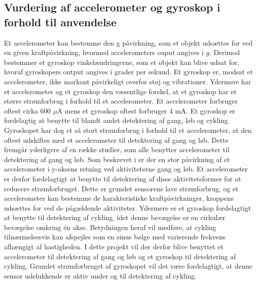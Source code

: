 \subsection{Vurdering af accelerometer og gyroskop i forhold til anvendelse}\label{acc_og_gyro}
Et accelerometer kan bestemme den g påvirkning, som et objekt udsættes for ved en given kraftpåvirkning, hvormed accelerometers ouput angives i $g$. Derimod bestemmer et gyroskop vinkelændringerne, som et objekt kan blive udsat for, hvoraf gyroskopers output angives i grader per sekund. Et gyroskop er, modsat et accelerometer, ikke markant påvirkeligt overfor støj og vibrationer. \citep{Goodrich2013,TittertonWeston2004,LuingeVeltink2005} \newline
Ydermere har et accelerometer og et gyroskop den væsentlige forskel, at et gyroskop har et større strømforbrug i forhold til et accelerometer. Et accelerometer forbruger oftest cirka 600 $\mu$A mens et gyroskop oftest forbruger 4 mA. Et gyroskop er fordelagtig at benytte til blandt andet detektering af gang, løb og cykling. Gyroskopet har dog et så stort strømforbrug i forhold til et accelerometer, at den oftest udskiftes med et accelerometer til detektering af gang og løb. Dette fremgår yderligere af en række studier, som alle benytter accelerometer til detektering af gang og løb. \citep{Rueterbories2010,Sparkfun,ClelandKikhia2013} \newline
Som beskrevet i  er der en stor påvirkning af et accelerometer i y-aksens retning ved aktiviteterne gang og løb. Et accelerometer er derfor fordelagtigt at benytte til detektering af disse aktivitetsformer for at reducere strømforbruget. Dette er grundet sensorens lave strømforbrug, og et accelerometer kan bestemme de karakteristiske kraftpåvirkninger, kroppens udsættes for ved de pågældende aktiviteter. Ydermere er et gyroskop fordelagtigt at benytte til detektering af cykling, idet denne bevægelse er en cirkulær bevægelse omkring én akse. Betydningen heraf vil medføre, at cykling tilnærmelsesvis kan afspejles som en sinus bølge med varierende frekvens afhængigt af hastigheden. \newline
I dette projekt vil der derfor blive benyttet et accelerometer til detektering af gang og løb og et gyroskop til detektering af cykling. Grundet strømforbruget af gyroskopet vil det være fordelagtigt, at denne sensor udelukkende er aktiv under og til detektering af cykling.%
